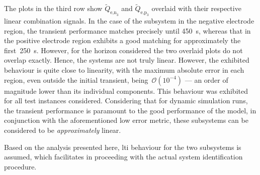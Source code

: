 The   plots   in  the   third   row   show  $\widetilde{Q}_{\text{e,n}_3}$   and
$\widetilde{Q}_{\text{e,p}_3}$ overlaid with their respective linear combination
signals. In  the case  of the  subsystem in the  negative electrode  region, the
transient performance matches  precisely until \approx\SI{450}{\second}, whereas
that in the positive electrode region exhibits a good matching for approximately
the  first~\SI{250}{\second}.  However,  for  the  horizon  considered  the  two
overlaid plots do not overlap exactly.  Hence, the systems are not truly linear.
However,  the  exhibited  behaviour  is  quite  close  to  linearity,  with  the
maximum  absolute error  in each  region,  even outside  the initial  transient,
being~$\mathcal{O}(10^{-4})$ --- an order of magnitude lower than its individual
components.  This behaviour  was exhibited  for all  test instances  considered.
Considering  that for  dynamic  simulation runs,  the  transient performance  is
paramount  to  the good  performance  of  the  model,  in conjunction  with  the
aforementioned  low error  metric,  these  subsystems can  be  considered to  be
\emph{approximately} linear.

Based  on  the  analysis  presented   here,  \gls{lti}  behaviour  for  the  two
subsystems is  assumed, which facilitates  in proceeding with the  actual system
identification procedure.


